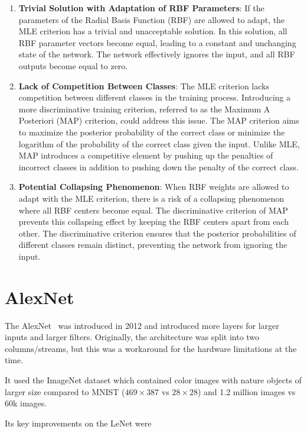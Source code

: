 \documentclass[11pt]{article}
\begin{document}
\begin{enumerate}
    \item \textbf{Trivial Solution with Adaptation of RBF Parameters}:
        If the parameters of the Radial Basis Function (RBF) are allowed to adapt, the MLE criterion has a trivial and unacceptable solution.
        In this solution, all RBF parameter vectors become equal, leading to a constant and unchanging state of the network.
        The network effectively ignores the input, and all RBF outputs become equal to zero.
    \item \textbf{Lack of Competition Between Classes}:
        The MLE criterion lacks competition between different classes in the training process.
        Introducing a more discriminative training criterion, referred to as the Maximum A Posteriori (MAP) criterion, could address this issue.
        The MAP criterion aims to maximize the posterior probability of the correct class or minimize the logarithm of the probability of the correct class given the input.
        Unlike MLE, MAP introduces a competitive element by pushing up the penalties of incorrect classes in addition to pushing down the penalty of the correct class.
    \item \textbf{Potential Collapsing Phenomenon}:
        When RBF weights are allowed to adapt with the MLE criterion, there is a risk of a collapsing phenomenon where all RBF centers become equal.
        The discriminative criterion of MAP prevents this collapsing effect by keeping the RBF centers apart from each other.
        The discriminative criterion ensures that the posterior probabilities of different classes remain distinct, preventing the network from ignoring the input.
\end{enumerate}

\section{AlexNet}

The AlexNet~\cite{AlexNet} was introduced in 2012 and introduced more layers for larger inputs and larger filters. Originally, the architecture was split into two columns/streams, but this was a workaround for the hardware limitations at the time. 

It used the ImageNet dataset which contained color images with nature objects of larger size compared to MNIST ($469\times 387$ vs $28 \times 28$) and 1.2 million images vs 60k images.

Its key improvements on the LeNet were
\end{document}

